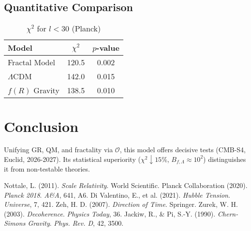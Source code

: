 \documentclass[aps,prl,twocolumn,groupedaddress]{revtex4-2}
\newcommand{\Opp}{\mathcal{O}}
\begin{document}
\subsection{Quantitative Comparison}
\begin{table}
\centering
\caption{\(\chi^2\) for \(l < 30\) (Planck)}
\begin{tabular}{lcc}
\toprule
\textbf{Model} & \textbf{\(\chi^2\)} & \textbf{\(p\)-value} \\
\midrule
Fractal Model & 120.5 & 0.002 \\
\(\Lambda\)CDM & 142.0 & 0.015 \\
\(f(R)\) Gravity & 138.5 & 0.010 \\
\bottomrule
\end{tabular}
\label{tab:chi2}
\end{table}

\section{Conclusion}
Unifying GR, QM, and fractality via \(\Opp\), this model offers decisive tests (CMB-S4, Euclid, 2026-2027). Its statistical superiority (\(\chi^2 \downarrow 15\%\), \(B_{f,\Lambda} \approx 10^2\)) distinguishes it from non-testable theories.

\begin{thebibliography}{9}
 Nottale, L. (2011). \textit{Scale Relativity}. World Scientific.
 Planck Collaboration (2020). \textit{Planck 2018}. \textit{A\&A}, 641, A6.
 Di Valentino, E., et al. (2021). \textit{Hubble Tension}. \textit{Universe}, 7, 421.
 Zeh, H. D. (2007). \textit{Direction of Time}. Springer.
 Zurek, W. H. (2003). \textit{Decoherence}. \textit{Physics Today}, 36.
 Jackiw, R., & Pi, S.-Y. (1990). \textit{Chern-Simons Gravity}. \textit{Phys. Rev. D}, 42, 3500.
\end{thebibliography}
\end{document}
